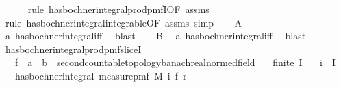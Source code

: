 \begin{isabellebody}
\ \ \ \ \isamarkupfalse%
\ {\isacharparenleft}{\kern0pt}rule\ has{\isacharunderscore}{\kern0pt}bochner{\isacharunderscore}{\kern0pt}integral{\isacharunderscore}{\kern0pt}prod{\isacharunderscore}{\kern0pt}pmfI{\isacharbrackleft}{\kern0pt}OF\ assms{\isacharparenleft}{\kern0pt}{}{\isacharparenright}{\kern0pt}{\isacharbrackright}{\kern0pt}{\isacharparenright}{\kern0pt}\isanewline
\ \ \ \ \isamarkupfalse%
\ {\isacharparenleft}{\kern0pt}rule\ has{\isacharunderscore}{\kern0pt}bochner{\isacharunderscore}{\kern0pt}integral{\isacharunderscore}{\kern0pt}integrable{\isacharbrackleft}{\kern0pt}OF\ assms{\isacharparenleft}{\kern0pt}{}{\isacharparenright}{\kern0pt}{\isacharbrackright}{\kern0pt}{\isacharcomma}{\kern0pt}\ simp{\isacharparenright}{\kern0pt}\isanewline
\ \ \isamarkupfalse%
\ {\isacharquery}{\kern0pt}A\ \isamarkupfalse%
\ a\ has{\isacharunderscore}{\kern0pt}bochner{\isacharunderscore}{\kern0pt}integral{\isacharunderscore}{\kern0pt}iff\ \isamarkupfalse%
\ blast\isanewline
\ \ \isamarkupfalse%
\ {\isacharquery}{\kern0pt}B\ \isamarkupfalse%
\ a\ has{\isacharunderscore}{\kern0pt}bochner{\isacharunderscore}{\kern0pt}integral{\isacharunderscore}{\kern0pt}iff\ \isamarkupfalse%
\ blast\isanewline
{}\isamarkupfalse%
%
\endisatagproof
{\isafoldproof}%
%
\isadelimproof
\isanewline
%
\endisadelimproof
\isanewline
{}\isamarkupfalse%
\ has{\isacharunderscore}{\kern0pt}bochner{\isacharunderscore}{\kern0pt}integral{\isacharunderscore}{\kern0pt}prod{\isacharunderscore}{\kern0pt}pmf{\isacharunderscore}{\kern0pt}sliceI{\isacharcolon}{\kern0pt}\isanewline
\ \ \ f\ {\isacharcolon}{\kern0pt}{\isacharcolon}{\kern0pt}\ {\isachardoublequoteopen}{\isacharprime}{\kern0pt}a\ {\isasymRightarrow}\ {\isacharparenleft}{\kern0pt}{\isacharprime}{\kern0pt}b\ {\isacharcolon}{\kern0pt}{\isacharcolon}{\kern0pt}\ {\isacharbraceleft}{\kern0pt}second{\isacharunderscore}{\kern0pt}countable{\isacharunderscore}{\kern0pt}topology{\isacharcomma}{\kern0pt}banach{\isacharcomma}{\kern0pt}real{\isacharunderscore}{\kern0pt}normed{\isacharunderscore}{\kern0pt}field{\isacharbraceright}{\kern0pt}{\isacharparenright}{\kern0pt}{\isachardoublequoteclose}\isanewline
\ \ \ {\isachardoublequoteopen}finite\ I{\isachardoublequoteclose}\isanewline
\ \ \ {\isachardoublequoteopen}i\ {\isasymin}\ I{\isachardoublequoteclose}\isanewline
\ \ \ {\isachardoublequoteopen}has{\isacharunderscore}{\kern0pt}bochner{\isacharunderscore}{\kern0pt}integral\ {\isacharparenleft}{\kern0pt}measure{\isacharunderscore}{\kern0pt}pmf\ {\isacharparenleft}{\kern0pt}M\ i{\isacharparenright}{\kern0pt}{\isacharparenright}{\kern0pt}\ {\isacharparenleft}{\kern0pt}f{\isacharparenright}{\kern0pt}\ r{\isachardoublequoteclose}\isanewline

\end{isabellebody}
